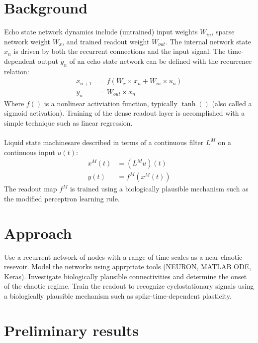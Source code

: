 \documentclass[a4paper,11pt]{article}
\numberwithin{equation}{section}
\begin{document}
\section{Background}
Echo state network dynamics include (untrained) input weights $W_{in}$, sparse network weight $W_x$, and trained readout weight $W_{out}$.
The internal network state $x_n$ is driven by both the recurrent connections and the input signal.
The time-dependent output $y_n$ of an echo state network can be defined with the recurrence relation:
\begin{align}
 x_{n+1} &= f(W_x \times x_n + W_{in} \times u_n)\\
 y_n &= W_{out} \times x_n
\end{align}
Where $f()$ is a nonlinear activiation function, typically $\tanh{()} $ (also called a sigmoid activation).
Training of the dense readout layer is accomplished with a simple technique such as linear regression.
\\ \\
Liquid state machinesare described in terms of a continuous filter $L^M$ on a continuous input $u(t)$:
\begin{align}
 x^M(t) &= (L^Mu)(t)\\
 y(t) &= f^M(x^M(t))
\end{align}
The readout map $f^M$ is trained using a biologically plausible mechanism such as the modified perceptron learning rule.

\section{Approach}
Use a recurrent network of nodes with a range of time scales as a near-chaotic resevoir.
Model the networks using apprpriate tools (NEURON, MATLAB ODE, Keras).
Investigate biologically plausible connectivities and determine the onset of the chaotic regime.
Train the readout to recognize cyclostationary signals using a biologically plausible mechanism such as spike-time-dependent plasticity.


\section{Preliminary results}
\end{document}
